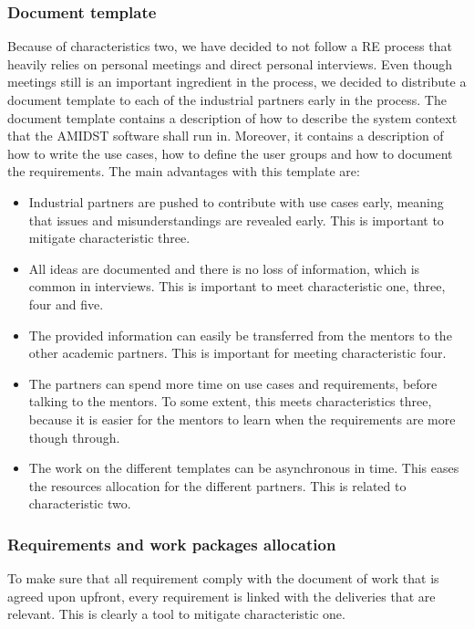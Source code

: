 \subsubsection*{Document template}

Because of characteristics two, we have decided to not follow a RE process that heavily relies on personal meetings and direct personal interviews.  Even though meetings still is an important ingredient in the process, we decided to distribute a document template to each of the industrial partners early in the process. The document template contains a description of how to describe the system context that the AMIDST software shall run in.  Moreover, it contains a description of how to write the use cases, how to define the user groups and how to document the requirements.
The main advantages with this template are:

\begin{itemize}
\item Industrial partners are pushed to contribute with use cases early, meaning that issues and misunderstandings are revealed early.  This is important to mitigate characteristic three.
\item All ideas are documented and there is no loss of information, which is common in interviews.  This is important to meet characteristic one, three, four and five.
\item The provided information can easily be transferred from the mentors to the other academic partners.  This is important for meeting characteristic four.
\item  The partners can spend more time on use cases and requirements, before talking to the mentors.  To some extent, this meets characteristics three, because it is easier for the mentors to learn when the requirements are more though through.
\item The work on the different templates can be asynchronous in time.  This eases the resources allocation for the different partners.  This is related to characteristic two.
\end{itemize}


\subsubsection*{Requirements and work packages allocation}

To make sure that all requirement comply with the document of work that is agreed upon upfront, every requirement is linked with the deliveries that are relevant.  This is clearly a tool to mitigate characteristic one.

